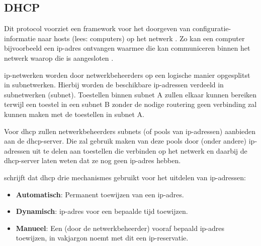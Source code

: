 \subsection{DHCP}
Dit protocol voorziet een framework voor het doorgeven van configuratie-informatie naar hosts (lees: computers) op het netwerk . Zo kan een computer bijvoorbeeld een \acrshort{ip}-adres ontvangen waarmee die kan communiceren binnen het netwerk waarop die is aangesloten \autocite{Droms1997}.

\acrshort{ip}-netwerken worden door netwerkbeheerders op een logische manier opgesplitst in subnetwerken. Hierbij worden de beschikbare \acrshort{ip}-adressen verdeeld in subnetwerken (subnet). Toestellen binnen subnet A zullen elkaar kunnen bereiken terwijl een toestel in een subnet B zonder de nodige routering geen verbinding zal kunnen maken met de toestellen in subnet A.

Voor \acrshort{dhcp} zullen netwerkbeheerders subnets (of pools van \acrshort{ip}-adressen) aanbieden aan de \acrshort{dhcp}-server. Die zal gebruik maken van deze pools door (onder andere) \acrshort{ip}-adressen uit te delen aan toestellen die verbinden op het netwerk en daarbij de \acrshort{dhcp}-server laten weten dat ze nog geen \acrshort{ip}-adres hebben.

\textcite{Droms1997} schrijft dat \acrshort{dhcp} drie mechanismes gebruikt voor het uitdelen van \acrshort{ip}-adressen:
\begin{itemize}
    \item \textbf{Automatisch}: Permanent toewijzen van een \acrshort{ip}-adres.
    \item \textbf{Dynamisch}: \acrshort{ip}-adres voor een bepaalde tijd toewijzen.
    \item \textbf{Manueel}: Een (door de netwerkbeheerder) vooraf bepaald \acrshort{ip}-adres toewijzen, in vakjargon noemt met dit een \acrshort{ip}-reservatie.
\end{itemize}

